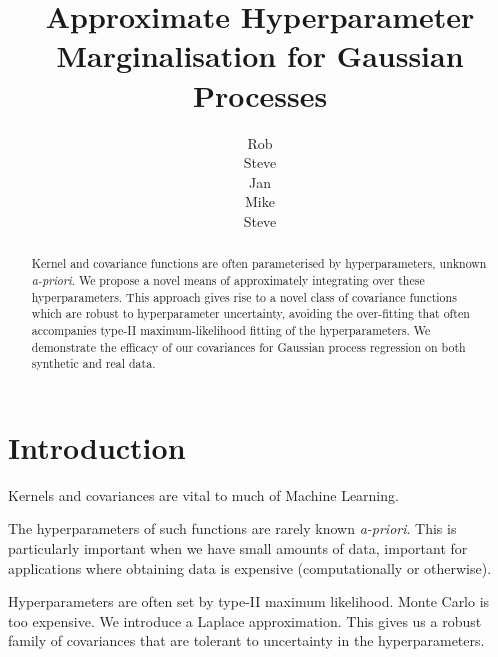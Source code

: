 \documentclass{article}
\title{Approximate Hyperparameter Marginalisation for Gaussian Processes}
\author{
Rob\\
\And
Steve\\
\And
Jan\\
\And
Mike\\
\And
Steve\\}
\newcommand\jansays[1]{\textcolor{blue}{Jan says: #1}}
\begin{document}
\maketitle

\begin{abstract}
Kernel and covariance functions are often parameterised by hyperparameters, unknown {\it a-priori}. We propose a novel means of approximately integrating over these hyperparameters. This approach gives rise to a novel class of covariance functions which are robust to hyperparameter uncertainty, avoiding the over-fitting that often accompanies type-II maximum-likelihood fitting of the hyperparameters. We demonstrate the efficacy of our covariances for Gaussian process regression on both synthetic and real data.
\end{abstract}


\section{Introduction}

Kernels and covariances are vital to much of Machine Learning. 

The hyperparameters of such functions are rarely known {\it a-priori}. This is particularly important when we have small amounts of data, important for applications where obtaining data is expensive (computationally or otherwise).

Hyperparameters are often set by type-II maximum likelihood. Monte Carlo is too expensive. We introduce a Laplace approximation. This gives us a robust family of covariances that are tolerant to uncertainty in the hyperparameters. 
\end{document}
